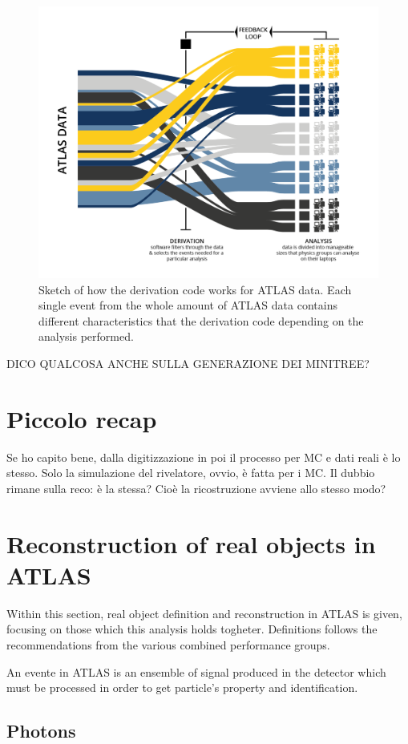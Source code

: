 \begin{figure}[tp]
\centering
\includegraphics[width=.7\textwidth]{MCSample/Derivation}
\caption{Sketch of how the derivation code works for ATLAS data. Each single event from the whole amount of ATLAS data contains different characteristics that the derivation code depending on the analysis performed.}
\label{fig:derivation}
\end{figure}

DICO QUALCOSA ANCHE SULLA GENERAZIONE DEI MINITREE?

\section{Piccolo recap}
Se ho capito bene, dalla digitizzazione in poi il processo per MC e dati reali \`e lo stesso. Solo la simulazione del rivelatore, ovvio, \`e fatta per i MC.
Il dubbio rimane sulla reco: \`e la stessa? Cio\`e la ricostruzione avviene allo stesso modo?

\section{Reconstruction of real objects in ATLAS}
\label{sec:recoreal}
Within this section, real object definition and reconstruction in ATLAS is given, focusing on those which this analysis holds togheter. Definitions follows the recommendations from the various combined performance groups. 

An evente in ATLAS is an ensemble of signal produced in the detector which must be processed in order to get particle's property and identification. 

\subsection{Photons}
\label{photons}
